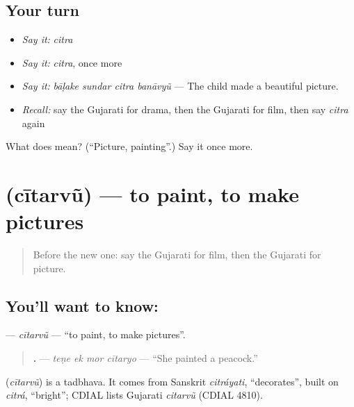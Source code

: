 \subsection*{Your turn}
\begin{itemize}
\raggedright
  \item \emph{Say it:} \emph{citra}
  \item \emph{Say it:} \emph{citra}, once more
  \item \emph{Say it:} \emph{bāḷake sundar citra banāvyũ} — The child made a beautiful picture.
  \item \emph{Recall:} say the Gujarati for drama, then the Gujarati for film, then say \emph{citra} again
\end{itemize}

\begin{tcolorbox}[breakable,colback=teal!4,colframe=teal!35!black,title={Before you move on}]
What does  mean? (\textquotedblleft{}Picture, painting\textquotedblright{}.) Say it once more.
\end{tcolorbox}
\section[\texorpdfstring{\gu{ચીતરવું} (cītarvũ)}{ચીતરવું (cītarvũ)}]{ (cītarvũ) — to paint, to make pictures}

\label{lesson:GU-C256-citarvu}



\begin{quote}
Before the new one: say the Gujarati for film, then the Gujarati for picture.
\end{quote}

\subsection*{You'll want to know: }
\textbf{} — \emph{cītarvũ} — \textquotedblleft{}to paint, to make pictures\textquotedblright{}.

\begin{quote}
\textbf{   .} — \emph{teṇe ek mor cītaryo} — \textquotedblleft{}She painted a peacock.\textquotedblright{}
\end{quote}

\begin{cousinweb}
\textbf{} (\emph{cītarvũ}) is a tadbhava. It comes from Sanskrit \emph{citráyati}, \textquotedblleft{}decorates\textquotedblright{}, built on \emph{citrá}, \textquotedblleft{}bright\textquotedblright{}; CDIAL lists Gujarati \emph{citarvũ} (CDIAL 4810).
\end{cousinweb}

